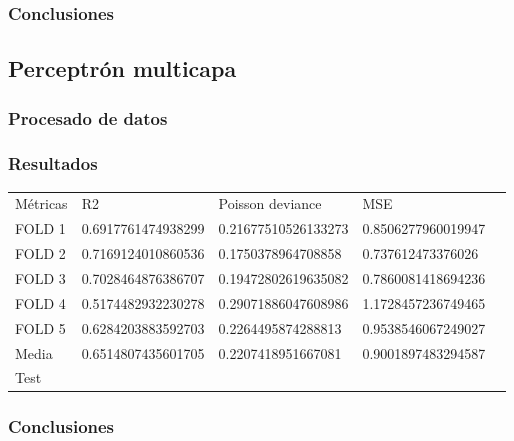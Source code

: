 \subsubsection{Conclusiones}

\subsection{Perceptrón multicapa}
\subsubsection{Procesado de datos}
\subsubsection{Resultados}
\begin{table}[htbp]
    \begin{tabular}{|l|l|l|l|l}
    \cline{1-4}
    Métricas & R2                  & Poisson deviance    & MSE                \\ \cline{1-4}
    FOLD 1   & 0.6917761474938299  & 0.21677510526133273 & 0.8506277960019947 \\ \cline{1-4}
    FOLD 2   & 0.7169124010860536  & 0.1750378964708858  & 0.737612473376026  \\ \cline{1-4}
    FOLD 3   & 0.7028464876386707  & 0.19472802619635082 & 0.7860081418694236 \\ \cline{1-4}
    FOLD 4   & 0.5174482932230278  & 0.29071886047608986 & 1.1728457236749465 \\ \cline{1-4}
    FOLD 5   & 0.6284203883592703  & 0.2264495874288813  & 0.9538546067249027 \\ \cline{1-4}
    Media    & 0.6514807435601705  & 0.2207418951667081  & 0.9001897483294587 \\ \cline{1-4}
    Test & & & \\ \cline{1-4}
\end{tabular}
\end{table}
\subsubsection{Conclusiones}
